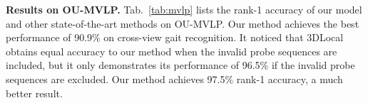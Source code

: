 \documentclass[runningheads]{llncs}
\begin{document}
\textbf{Results on OU-MVLP.} Tab.~\ref{tab:mvlp} lists the rank-1 accuracy of our model and other state-of-the-art methods on OU-MVLP. Our method achieves the best performance of 90.9\% on cross-view gait recognition. It noticed that 3DLocal obtains equal accuracy to our method when the invalid probe sequences are included, but it only demonstrates its performance of 96.5\% if the invalid probe sequences are excluded. Our method achieves 97.5\% rank-1 accuracy, a much better result.



\begin{table}[htbp]
    \caption{Rank-1 accuracy (\%) on OUMVLP dataset under different view angles, excluding identical-view cases. The top eight rows and bottom six rows show the results with and without invalid probe sequences, respectively.}
  \centering
  \label{tab:mvlp}
  \vspace*{-1em}
\end{table}
\end{document}
